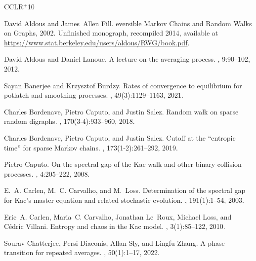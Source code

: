 \documentclass[11pt,reqno]{amsart}
\theoremstyle{remark}
\theoremstyle{definition}
\numberwithin{equation}{section}
\numberwithin{figure}{section}
\begin{document}
%	
%	

\newcommand{\etalchar}[1]{$^{#1}$}
\begin{thebibliography}{CCLR{\etalchar{+}}10}
	
	David Aldous and James~Allen Fill.
	eversible {M}arkov {C}hains and {R}andom {W}alks on {G}raphs,
	2002.
	\newblock Unfinished monograph, recompiled 2014, available at
	\url{https://www.stat.berkeley.edu/users/aldous/RWG/book.pdf}.
	
	David Aldous and Daniel Lanoue.
	\newblock A lecture on the averaging process.
	, 9:90--102, 2012.
	
	Sayan Banerjee and Krzysztof Burdzy.
	\newblock Rates of convergence to equilibrium for potlatch and smoothing
	processes.
	, 49(3):1129--1163, 2021.
	
	Charles Bordenave, Pietro Caputo, and Justin Salez.
	\newblock Random walk on sparse random digraphs.
	, 170(3-4):933--960, 2018.
	
	Charles Bordenave, Pietro Caputo, and Justin Salez.
	\newblock Cutoff at the ``entropic time'' for sparse {M}arkov chains.
	, 173(1-2):261--292, 2019.
	
	Pietro Caputo.
	\newblock On the spectral gap of the {K}ac walk and other binary collision
	processes.
	, 4:205--222, 2008.
	
	E.~A. Carlen, M.~C. Carvalho, and M.~Loss.
	\newblock Determination of the spectral gap for {K}ac's master equation and
	related stochastic evolution.
	, 191(1):1--54, 2003.
	
	\bibitem[CCLR{\etalchar{+}}10]{carlen_entropy_2010}
	Eric~A. Carlen, Maria~C. Carvalho, Jonathan Le~Roux, Michael Loss, and C\'edric
	Villani.
	\newblock Entropy and chaos in the {K}ac model.
	, 3(1):85--122, 2010.
	
	Sourav Chatterjee, Persi Diaconis, Allan Sly, and Lingfu Zhang.
	\newblock A phase transition for repeated averages.
	, 50(1):1--17, 2022.
	

\end{thebibliography}
\end{document}
